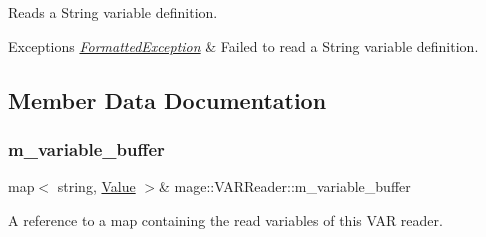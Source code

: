 Reads a String variable definition.


\begin{DoxyExceptions}{Exceptions}
{\em \hyperlink{classmage_1_1_formatted_exception}{Formatted\+Exception}} & Failed to read a String variable definition. \\
\hline
\end{DoxyExceptions}


\subsection{Member Data Documentation}
\hypertarget{classmage_1_1_v_a_r_reader_a379cbdc2840af20329fe930ac3852356}{}\label{classmage_1_1_v_a_r_reader_a379cbdc2840af20329fe930ac3852356} 
\subsubsection{\texorpdfstring{m\+\_\+variable\+\_\+buffer}{m\_variable\_buffer}}
{\footnotesize\ttfamily map$<$ string, \hyperlink{namespacemage_aa1fe0628487e0706e44efdc62dbdb3a2}{Value} $>$\& mage\+::\+V\+A\+R\+Reader\+::m\+\_\+variable\+\_\+buffer\hspace{0.3cm}{\ttfamily [private]}}

A reference to a map containing the read variables of this V\+AR reader. 